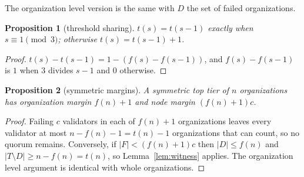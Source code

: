 \documentclass[11pt,a4paper]{article}
\newtheorem{proposition}{Proposition}
\begin{document}
The organization level version is the same with $D$ the set of failed organizations.

\begin{proposition}[threshold sharing]\label{prop:share}
$t(s)=t(s-1)$ exactly when $s\equiv 1 \pmod 3$; otherwise $t(s)=t(s-1)+1$.
\end{proposition}
\begin{proof}
$t(s)-t(s-1)=1-(f(s)-f(s-1))$, and $f(s)-f(s-1)$ is $1$ when $3$ divides $s-1$ and $0$ otherwise.
\end{proof}

\begin{proposition}[symmetric margins]\label{prop:sym}
A symmetric top tier of $n$ organizations has organization margin $f(n)+1$ and node margin $(f(n)+1)c$.
\end{proposition}
\begin{proof}
Failing $c$ validators in each of $f(n)+1$ organizations leaves every validator at most $n-f(n)-1=t(n)-1$ organizations that can count, so no quorum remains. Conversely, if $|F|<(f(n)+1)c$ then $|D|\le f(n)$ and $|T\setminus D|\ge n-f(n)=t(n)$, so Lemma~\ref{lem:witness} applies. The organization level argument is identical with whole organizations.
\end{proof}
\end{document}
